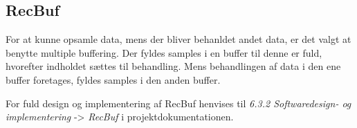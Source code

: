 \subsection{RecBuf}
For at kunne opsamle data, mens der bliver behanldet andet data, er det valgt at benytte multiple buffering. Der fyldes samples i en buffer til denne er fuld, hvorefter indholdet sættes til behandling. Mens behandlingen af data i den ene buffer foretages, fyldes samples i den anden buffer.

For fuld design og implementering af RecBuf henvises til \textit{6.3.2 Softwaredesign- og implementering} -> \textit{RecBuf} i projektdokumentationen. 